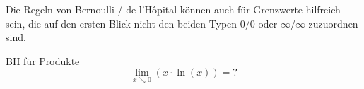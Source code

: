 
 Die Regeln von Bernoulli / de l'Hôpital können auch für Grenzwerte hilfreich sein, die auf den ersten Blick nicht den beiden Typen $0/0$  oder $\infty / \infty$  zuzuordnen sind.
 \begin{bsp}
    {BH für Produkte}{}
    \[
\lim_{{x \searrow 0}} ( x \cdot \ln(x)) = ? 
\]


\vspace{4cm}


 \end{bsp}


